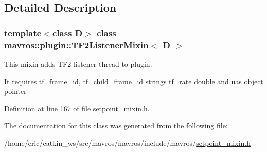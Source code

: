 \subsection{Detailed Description}
\subsubsection*{template$<$class D$>$\newline
class mavros\+::plugin\+::\+T\+F2\+Listener\+Mixin$<$ D $>$}

This mixin adds T\+F2 listener thread to plugin. 

It requires tf\+\_\+frame\+\_\+id, tf\+\_\+child\+\_\+frame\+\_\+id strings tf\+\_\+rate double and uas object pointer 

Definition at line 167 of file setpoint\+\_\+mixin.\+h.



The documentation for this class was generated from the following file\+:\begin{DoxyCompactItemize}
\item 
/home/eric/catkin\+\_\+ws/src/mavros/mavros/include/mavros/\mbox{\hyperlink{setpoint__mixin_8h}{setpoint\+\_\+mixin.\+h}}\end{DoxyCompactItemize}
